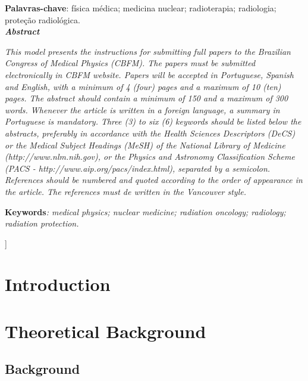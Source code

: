 \documentclass[10pt,twoside,twocolumn]{article}
\begin{document}
\begin{@twocolumnfalse}
\textbf{Palavras-chave}: f\'{i}sica m\'{e}dica; medicina nuclear; radioterapia; radiologia; prote\c{c}\~{a}o radiol\'{o}gica.\\



\textbf{\textit{Abstract}}

\textit{This model presents the instructions for submitting full papers to the Brazilian Congress of Medical Physics (CBFM). The papers must be submitted electronically in CBFM website. Papers will be accepted in Portuguese, Spanish and English, with a minimum of 4 (four) pages and a maximum of 10 (ten) pages. The abstract should contain a minimum of 150 and a maximum of 300 words. Whenever the article is written in a foreign language, a summary in Portuguese is mandatory. Three (3) to six (6) keywords should be listed below the abstracts, preferably in accordance with the Health Sciences Descriptors (DeCS) or the Medical Subject Headings (MeSH) of the National Library of Medicine (http://www.nlm.nih.gov), or the Physics and Astronomy Classification Scheme (PACS - http://www.aip.org/pacs/index.html), separated by a semicolon. References should be numbered and quoted according to the order of appearance in the article. The references must de written in the Vancouver style.}

\textbf{Keywords}\textit{: medical physics; nuclear medicine; radiation oncology; radiology; radiation protection.} 

\vspace{\baselineskip}
    \end{@twocolumnfalse}
 ]
 
 
 
\section{Introduction}

\lipsum

\section{Theoretical Background}
\subsection{Background}
\end{document}
